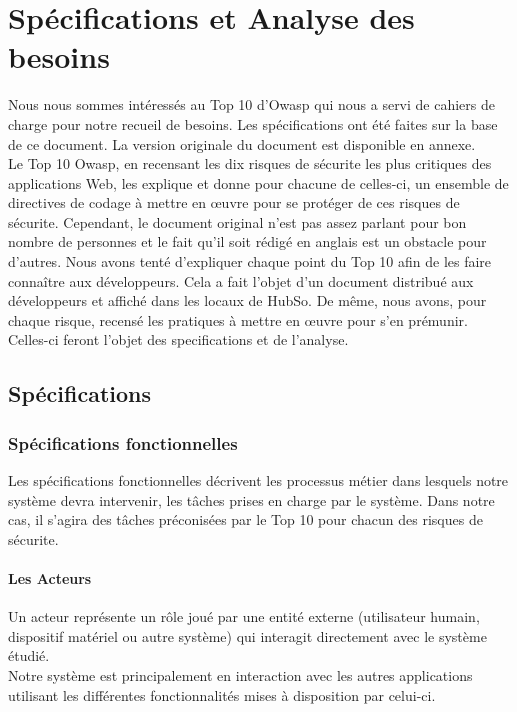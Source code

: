 \chapter{Spécifications et Analyse des besoins}
Nous nous sommes intéressés au Top 10 d'Owasp qui nous a servi de cahiers de charge pour notre recueil de besoins. Les spécifications ont été faites sur la base de ce document. La version originale du document est disponible en annexe.\\
Le Top 10 Owasp, en recensant les dix risques de sécurite les plus critiques des applications Web, les explique et donne pour chacune de celles-ci, un ensemble de directives de codage à mettre en œuvre pour se protéger de ces risques de sécurite. Cependant, le document original n'est pas assez parlant pour bon nombre de personnes et le fait qu'il soit rédigé en anglais est un obstacle pour d'autres. Nous avons tenté d'expliquer chaque point du Top 10 afin de les faire connaître aux développeurs. Cela a fait l'objet d'un document distribué aux développeurs et affiché dans les locaux de HubSo. De même, nous avons, pour chaque risque, recensé les pratiques à mettre en œuvre pour s'en prémunir. Celles-ci feront l'objet des specifications et de l'analyse.

\section{Spécifications}

\subsection{Spécifications fonctionnelles}
Les spécifications fonctionnelles décrivent les processus métier dans lesquels notre système devra intervenir, les tâches prises en charge par le système. Dans notre cas, il s'agira des tâches préconisées par le Top 10 pour chacun des risques de sécurite. 

\subsubsection{Les Acteurs}
Un acteur représente un rôle joué par une entité externe (utilisateur humain, dispositif matériel ou autre système) qui interagit directement avec le système étudié.\\
Notre système est principalement en interaction avec les autres applications utilisant les différentes fonctionnalités mises à disposition par celui-ci. 

